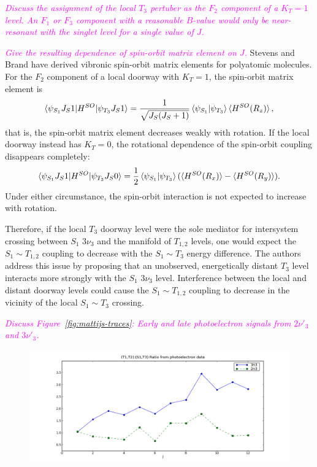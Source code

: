 \documentclass[12pt]{mitthesis}
\newcommand{\POINT}[1]{\textcolor{magenta}{\emph{#1}}}
\begin{document}
\POINT{Discuss the assignment of the local $T_3$ pertuber as the $F_2$
  component of a $K_T=1$ level.  An $F_1$ or $F_3$ component with a
  reasonable $B$-value would only be near-resonant with the singlet
  level for a single value of $J$.}

\POINT{Give the resulting dependence of spin-orbit matrix element on
  $J$.}  Stevens and Brand have derived vibronic spin-orbit matrix
elements for polyatomic molecules.  For the $F_2$ component of a local
doorway with $K_T=1$, the spin-orbit matrix element is
\begin{equation}
  \mathinner{\langle{\psi_{S_1}J_S1|H^{SO}|\psi_{T_3}J_S1}\rangle} = 
  \frac{1}{\sqrt{J_S(J_S+1)}}\mathinner{\langle{\psi_{S_1}|\psi_{T_3}}\rangle}\mathinner{\langle{H^{SO}(R_z)}\rangle},
\end{equation}
that is, the spin-orbit matrix element decreases weakly with rotation.
If the local doorway instead has $K_T=0$, the rotational dependence of
the spin-orbit coupling disappears completely: 
\begin{equation}
  \mathinner{\langle{\psi_{S_1}J_S1|H^{SO}|\psi_{T_3}J_S0}\rangle} =
  \frac{1}{2}\mathinner{\langle{\psi_{S_1}|\psi_{T_3}}\rangle}
  (\mathinner{\langle{H^{SO}(R_x)}\rangle} - \mathinner{\langle{H^{SO}(R_y)}\rangle}).
\end{equation}
Under either circumstance, the spin-orbit interaction is not expected
to increase with rotation.

Therefore, if the local $T_3$ doorway level were the sole mediator for
intersystem crossing between $S_1$ $3\nu_3$ and the manifold of
$T_{1,2}$ levels, one would expect the $S_1 \sim T_{1,2}$ coupling to
decrease with the $S_1 \sim T_3$ energy difference.  The authors
address this issue by proposing that an unobserved, energetically
distant $T_3$ level interacts more strongly with the $S_1$ $3\nu_3$
level.  Interference between the local and distant doorway levels
could cause the $S_1 \sim T_{1,2}$ coupling to decrease in the
vicinity of the local $S_1 \sim T_3$ crossing.



\POINT{Discuss Figure~\ref{fig:mattijs-traces}: Early and late photoelectron
signals from $2\nu'_3$ and $3\nu'_3$.}

\begin{figure}
  \centering
  \includegraphics[width=7in]{mattijs-ratios.png}
  \caption{}
  \label{fig:mattijs-ratios}
\end{figure}
\end{document}
